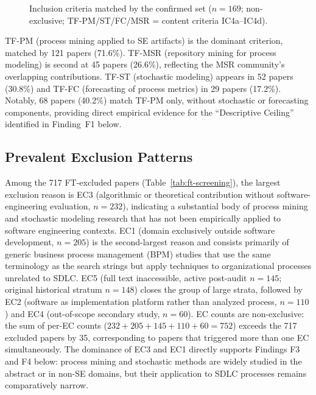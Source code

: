 \begin{figure}[htbp]
\centering
{}
\caption{Inclusion criteria matched by the confirmed set ($n = 169$;
  non-exclusive; TF-PM/ST/FC/MSR = content criteria IC4a--IC4d).}
\label{fig:ic-dist}
\end{figure}

TF-PM (process mining applied to SE artifacts) is the dominant criterion,
matched by 121 papers (71.6\%). TF-MSR (repository mining for process modeling)
is second at 45 papers (26.6\%), reflecting the MSR community's overlapping
contributions. TF-ST (stochastic modeling) appears in 52 papers (30.8\%) and
TF-FC (forecasting of process metrics) in 29 papers (17.2\%). Notably, 68
papers (40.2\%) match TF-PM only, without stochastic or forecasting components,
providing direct empirical evidence for the ``Descriptive Ceiling'' identified
in Finding~F1 below.

\subsection{Prevalent Exclusion Patterns}

Among the 717 FT-excluded papers (Table~\ref{tab:ft-screening}), the largest
exclusion reason is EC3 (algorithmic or theoretical contribution without
software-engineering evaluation, $n=232$), indicating a substantial body of
process mining and stochastic modeling research that has not been empirically
applied to software engineering contexts. EC1 (domain exclusively outside
software development, $n=205$) is the second-largest reason and consists
primarily of generic business process management (BPM) studies that use the
same terminology as the search strings but apply techniques to organizational
processes unrelated to SDLC. EC5 (full text inaccessible, active post-audit
$n=145$; original historical stratum $n=148$) closes the group of large
strata, followed by EC2 (software as implementation platform
rather than analyzed process, $n=110$) and EC4 (out-of-scope secondary study,
$n=60$). EC counts are non-exclusive: the sum of per-EC counts
($232+205+145+110+60 = 752$) exceeds the 717 excluded papers by 35,
corresponding to papers that triggered more than one EC simultaneously. The
dominance of EC3 and EC1 directly supports Findings F3 and F4
below: process mining and stochastic methods are widely studied in the
abstract or in non-SE domains, but their application to SDLC processes
remains comparatively narrow.

